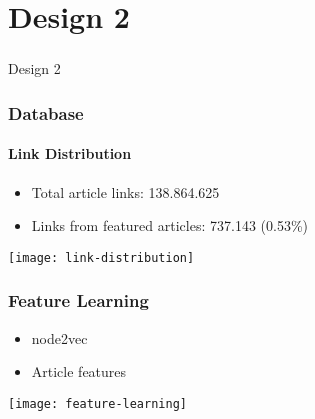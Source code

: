 \section[Design 2]{Design 2}

\begin{frame}
  \frametitle{}
  \begin{center}
    {\Huge Design 2}
  \end{center}
\end{frame}

\begin{frame}
    \frametitle{Database}
    \framesubtitle{Link Distribution}
    \centering

    \begin{itemize}
      \item Total article links: 138.864.625 %
      \item Links from featured articles: 737.143 (0.53\%)
    \end{itemize}

    \texttt{[image: link-distribution]}

\end{frame}


\begin{frame}
    \frametitle{Feature Learning}
    \centering

    \begin{itemize}
      \item node2vec
      \item Article features
    \end{itemize}

    \texttt{[image: feature-learning]}

\end{frame}


